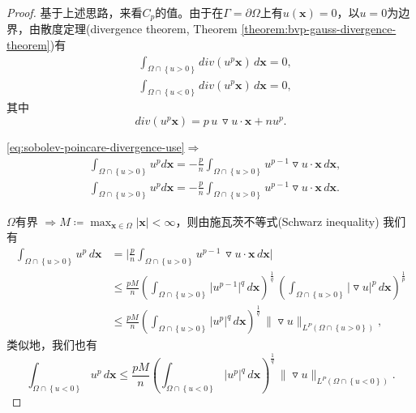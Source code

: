 \begin{proof}
基于上述思路，来看$C_p$的值。由于在$\Gamma=\partial \Omega$上有$u(\bm{x})=0$，以$u=0$为边界，由散度定理(divergence theorem, Theorem \ref{theorem:bvp-gauss-divergence-theorem})有
\begin{equation}
  \label{eq:sobolev-poincare-divergence-use}
  \begin{split}
    &\int_{\Omega \cap \left\{ u > 0 \right\}} div(u^p \bm{x}) \, d \bm{x} = 0,\\
    &\int_{\Omega \cap \left\{ u < 0 \right\}} div(u^p \bm{x}) \, d \bm{x} = 0,
  \end{split}
\end{equation}
其中
\begin{equation*}
  div(u^p \bm{x}) = p \, u \, \triangledown u \cdot \bm{x} + n u^p.
\end{equation*}

\eqref{eq:sobolev-poincare-divergence-use}$\Rightarrow$
\begin{equation}
  \begin{split}
    &\int_{\Omega \cap \left\{ u > 0 \right\}} u^p d \bm{x} = - \frac{p}{n} \int_{\Omega \cap \left\{ u > 0 \right\}} u^{p-1} \triangledown u \cdot \bm{x} \, d \bm{x}, \\
    &\int_{\Omega \cap \left\{ u > 0 \right\}} u^p d \bm{x} = - \frac{p}{n} \int_{\Omega \cap \left\{ u > 0 \right\}} u^{p-1} \triangledown u \cdot \bm{x} \, d \bm{x}.
  \end{split}
\end{equation}

$\Omega$有界 $\Rightarrow M \coloneqq \max_{\bm{x} \in \Omega}  \left| \bm{x} \right| < \infty$，则由施瓦茨不等式(Schwarz inequality) 我们有
\begin{equation*}
\begin{split}
    \int_{\Omega \cap \left\{ u > 0 \right\}} u^p \, d \bm{x} &=
    \Big| \frac{p}{n} \int_{\Omega \cap \left\{ u > 0 \right\}} u^{p-1} \, \triangledown u \cdot \bm{x} \, d \bm{x} \Big| \\
    &\le \frac{p M}{n}
    \left(
    \int_{\Omega \cap \left\{ u > 0 \right\}} \big| u^{p-1} \big|^q \, d \bm{x}
    \right)^{\frac{1}{q}} \,
    \left(
    \int_{\Omega \cap \left\{ u > 0 \right\}} \big| \triangledown u \big|^p \, d \bm{x}
    \right)^{\frac{1}{p}}\\
    &\le \frac{p M}{n}
    \left(
    \int_{\Omega \cap \left\{ u > 0 \right\}} \big| u^{p} \big|^q \, d \bm{x}
    \right)^{\frac{1}{q}} \,
    \big\| \triangledown u \big\|_{L^P(\Omega \cap \left\{ u > 0 \right\})},
\end{split}
\end{equation*}
类似地，我们也有
\begin{equation*}
  \int_{\Omega \cap \left\{ u < 0 \right\}} u^p \, d \bm{x} \le \frac{p M}{n}
  \left(
  \int_{\Omega \cap \left\{ u < 0 \right\}} \big| u^{p} \big|^q \, d \bm{x}
  \right)^{\frac{1}{q}} \,
  \big\| \triangledown u \big\|_{L^P(\Omega \cap \left\{ u < 0 \right\})}.
\end{equation*}


\end{proof}
